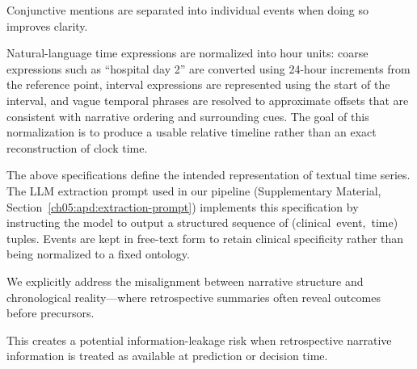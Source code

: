 Conjunctive mentions are separated into individual events when doing so improves clarity.

Natural-language time expressions are normalized into hour units: coarse expressions such as “hospital day 2” are converted using 24-hour increments from the reference point, interval expressions are represented using the start of the interval, and vague temporal phrases are resolved to approximate offsets that are consistent with narrative ordering and surrounding cues.
The goal of this normalization is to produce a usable relative timeline rather than an exact reconstruction of clock time.

The above specifications define the intended representation of textual time series.
The LLM extraction prompt used in our pipeline (Supplementary Material, Section~\ref{ch05:apd:extraction-prompt}) implements this specification by instructing the model to output a structured sequence of \mbox{(clinical event, time)} tuples.
Events are kept in free-text form to retain clinical specificity rather than being normalized to a fixed ontology.


We explicitly address the misalignment between narrative structure and chronological reality---where retrospective summaries often reveal outcomes before precursors.

This creates a potential information-leakage risk when retrospective narrative information is treated as available at prediction or decision time.


